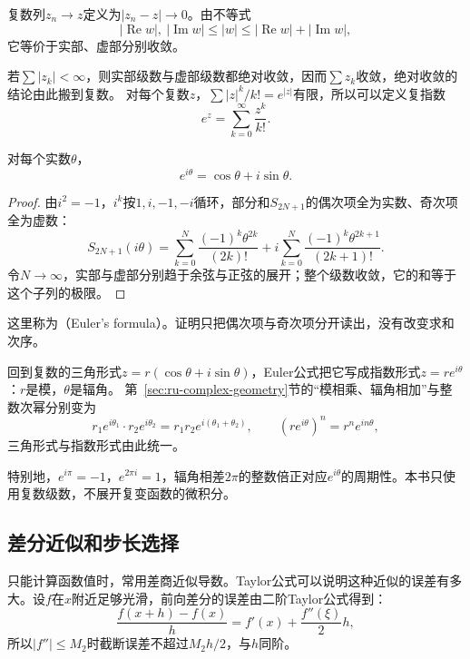 复数列$z_n\to z$定义为$|z_n-z|\to0$。由不等式
\[
 |\operatorname{Re}w|,\ |\operatorname{Im}w|\leq|w|\leq|\operatorname{Re}w|+|\operatorname{Im}w|,
\]
它等价于实部、虚部分别收敛。

若$\sum|z_k|<\infty$，则实部级数与虚部级数都绝对收敛，因而$\sum z_k$收敛，绝对收敛的结论由此搬到复数。
对每个复数$z$，$\sum|z|^k/k!=e^{|z|}$有限，所以可以定义复指数
\[
 e^z=\sum_{k=0}^\infty\frac{z^k}{k!}.
\]

\begin{theorem}[Euler公式]
\label{thm:ru-euler-formula}
对每个实数$\theta$，
\begin{equation}
 e^{i\theta}=\cos\theta+i\sin\theta.
 \label{eq:ru-euler-formula}
\end{equation}
\end{theorem}
\begin{proof}
由$i^2=-1$，$i^k$按$1,i,-1,-i$循环，部分和$S_{2N+1}$的偶次项全为实数、奇次项全为虚数：
\[
 S_{2N+1}(i\theta)=\sum_{k=0}^N\frac{(-1)^k\theta^{2k}}{(2k)!}+i\sum_{k=0}^N\frac{(-1)^k\theta^{2k+1}}{(2k+1)!}.
\]
令$N\to\infty$，实部与虚部分别趋于余弦与正弦的展开；整个级数收敛，它的和等于这个子列的极限。
\end{proof}
这里称为（Euler's formula）。证明只把偶次项与奇次项分开读出，没有改变求和次序。

回到复数的三角形式$z=r(\cos\theta+i\sin\theta)$，Euler公式把它写成指数形式$z=re^{i\theta}$：$r$是模，$\theta$是辐角。
第~\ref{sec:ru-complex-geometry}节的“模相乘、辐角相加”与整数次幂分别变为
\[
 r_1e^{i\theta_1}\cdot r_2e^{i\theta_2}=r_1r_2e^{i(\theta_1+\theta_2)},\qquad(re^{i\theta})^n=r^ne^{in\theta},
\]
三角形式与指数形式由此统一。

特别地，$e^{i\pi}=-1$，$e^{2\pi i}=1$，辐角相差$2\pi$的整数倍正对应$e^{i\theta}$的周期性。本书只使用复数级数，不展开复变函数的微积分。

\subsection{差分近似和步长选择}
\label{sec:ru-finite-differences}

只能计算函数值时，常用差商近似导数。Taylor公式可以说明这种近似的误差有多大。设$f$在$x$附近足够光滑，前向差分的误差由二阶Taylor公式得到：
\begin{equation}
 \frac{f(x+h)-f(x)}h=f'(x)+\frac{f''(\xi)}2h,
 \label{eq:ru-forward-difference}
\end{equation}
所以$|f''|\leq M_2$时截断误差不超过$M_2h/2$，与$h$同阶。

